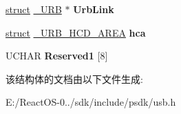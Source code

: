 \begin{DoxyCompactItemize}
\hyperlink{interfacestruct}{struct} \hyperlink{struct___u_r_b}{\+\_\+\+U\+RB} $\ast$ {\bfseries Urb\+Link}
\item 
\mbox{\label{struct___u_r_b___c_o_n_t_r_o_l___g_e_t___c_o_n_f_i_g_u_r_a_t_i_o_n___r_e_q_u_e_s_t_ab0c9b905cabcabaf057d03e0df8b3242}} 
\hyperlink{interfacestruct}{struct} \hyperlink{struct___u_r_b___h_c_d___a_r_e_a}{\+\_\+\+U\+R\+B\+\_\+\+H\+C\+D\+\_\+\+A\+R\+EA} {\bfseries hca}
\item 
\mbox{\label{struct___u_r_b___c_o_n_t_r_o_l___g_e_t___c_o_n_f_i_g_u_r_a_t_i_o_n___r_e_q_u_e_s_t_aed32d984c50beaa2d8fa55c0e29929b9}} 
U\+C\+H\+AR {\bfseries Reserved1} \mbox{[}8\mbox{]}
\end{DoxyCompactItemize}


该结构体的文档由以下文件生成\+:\begin{DoxyCompactItemize}
\item 
E\+:/\+React\+O\+S-\/0../sdk/include/psdk/usb.\+h\end{DoxyCompactItemize}
